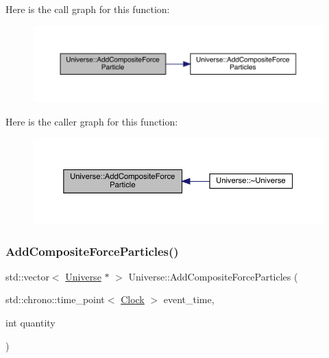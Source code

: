 Here is the call graph for this function\+:
\nopagebreak
\begin{figure}[H]
\begin{center}
\leavevmode
\includegraphics[width=350pt]{class_universe_ab2671c2218c98f0f1f487c5b3bb96e3c_cgraph}
\end{center}
\end{figure}
Here is the caller graph for this function\+:
\nopagebreak
\begin{figure}[H]
\begin{center}
\leavevmode
\includegraphics[width=350pt]{class_universe_ab2671c2218c98f0f1f487c5b3bb96e3c_icgraph}
\end{center}
\end{figure}
\mbox{\label{class_universe_a23d74e377203fca7cb74e0ffee7244b6}} 
\subsubsection{\texorpdfstring{Add\+Composite\+Force\+Particles()}{AddCompositeForceParticles()}}
{\footnotesize\ttfamily std\+::vector$<$ \hyperlink{class_universe}{Universe} $\ast$ $>$ Universe\+::\+Add\+Composite\+Force\+Particles (\begin{DoxyParamCaption}\item[{std\+::chrono\+::time\+\_\+point$<$ \hyperlink{universe_8h_a0ef8d951d1ca5ab3cfaf7ab4c7a6fd80}{Clock} $>$}]{event\+\_\+time,  }\item[{int}]{quantity }\end{DoxyParamCaption})}



